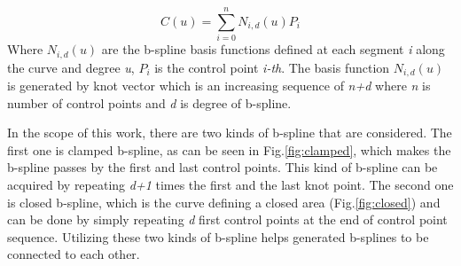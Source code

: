 \documentclass{article}
\begin{document}
\[ C(u) = {\sum_{i=0}^n} N_{i,d}(u)P_i \]
Where $N_{i,d}(u)$ are the b-spline basis functions defined at each segment \textit{i} along the curve and degree \textit{u}, $P_i$ is the control point \textit{i-th}. The basis function $N_{i,d}(u)$ is generated by knot vector which is an increasing sequence of \textit{n+d} where \textit{n} is number of control points and \textit{d} is degree of b-spline.

In the scope of this work, there are two kinds of b-spline that are considered. The first one is clamped b-spline, as can be seen in Fig.\ref{fig:clamped}, which makes the b-spline passes by the first and last control points. This kind of b-spline can be acquired by repeating \textit{d+1} times the first and the last knot point.
The second one is closed b-spline, which is the curve defining a closed area (Fig.\ref{fig:closed}) and can be done by simply repeating \textit{d} first control points at the end of control point sequence. Utilizing these two kinds of b-spline helps generated b-splines to be connected to each other.
\end{document}
